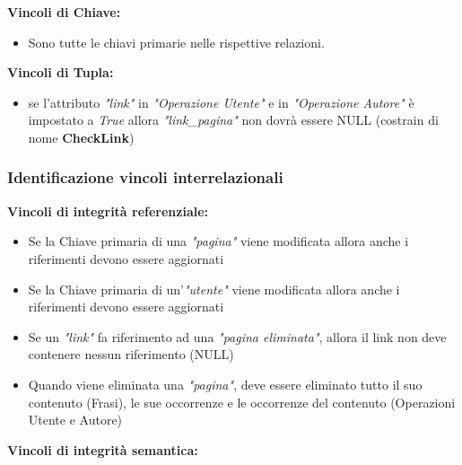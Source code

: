 \textbf{Vincoli di Chiave:}
\begin{itemize}
    \item {Sono tutte le chiavi primarie nelle rispettive relazioni.}\newline
\end{itemize}
\textbf{Vincoli di Tupla:}
\begin{itemize}
    \item {se l'attributo \textit{"link"} in \textit{"Operazione Utente"} e in \textit{"Operazione Autore"} è impostato a \textit{True} allora \textit{"link\_pagina"} non dovrà essere NULL (costrain di nome \textbf{CheckLink})}
    
\end{itemize}

\subsubsection{Identificazione vincoli interrelazionali}
\textbf{Vincoli di integrità referenziale:}
\begin{itemize}

    \item {Se la Chiave primaria di una \textit{"pagina"} viene modificata allora anche i riferimenti devono essere aggiornati}
    \item {Se la Chiave primaria di un'\textit{"utente"} viene modificata allora anche i riferimenti devono essere aggiornati}
    \item {Se un \textit{"link"} fa riferimento ad una \textit{"pagina eliminata"}, allora il link non deve contenere nessun riferimento (NULL)}
    \item {Quando viene eliminata una \textit{"pagina"}, deve essere eliminato tutto il suo contenuto (Frasi), le sue occorrenze e le occorrenze del contenuto (Operazioni Utente e Autore)}\newline
\end{itemize}
\textbf{Vincoli di integrità semantica:}
